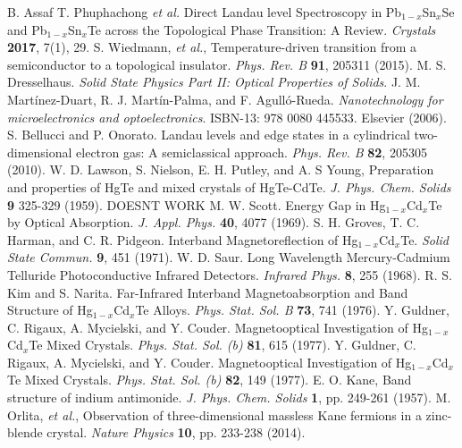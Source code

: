 \documentclass[titlepage,a4paper]{book}
\begin{document}
\begin{thebibliography}{199}
B. Assaf
T. Phuphachong  \textit{et al.} Direct Landau level Spectroscopy in Pb$_{1-x}$Sn$_x$Se and Pb$_{1-x}$Sn$_x$Te across the Topological Phase Transition: A Review. \textit{Crystals} \textbf{2017}, 7(1), 29.
S. Wiedmann, \textit{et al.}, Temperature-driven transition from a semiconductor to a topological insulator. \textit{Phys. Rev. B} \textbf{91}, 205311 (2015).
M. S. Dresselhaus. \textit{Solid State Physics Part II: Optical Properties of Solids}.
J. M. Martínez-Duart, R. J. Martín-Palma, and F. Agulló-Rueda. \textit{Nanotechnology for microelectronics and optoelectronics}. ISBN-13: 978 0080 445533. Elsevier (2006).
S. Bellucci and P. Onorato. Landau levels and edge states in a cylindrical two-dimensional electron gas: A semiclassical approach. \textit{Phys. Rev. B} \textbf{82}, 205305 (2010).
W. D. Lawson, S. Nielson, E. H. Putley, and A. S Young, Preparation and properties of HgTe and mixed crystals of HgTe-CdTe. \textit{J. Phys. Chem. Solids} \textbf{9} 325-329 (1959).
DOESNT WORK
M. W. Scott. Energy Gap in Hg$_{1-x}$Cd$_x$Te by Optical Absorption. \textit{J. Appl. Phys.} \textbf{40}, 4077 (1969).
S. H. Groves, T. C. Harman, and C. R. Pidgeon. Interband Magnetoreflection of Hg$_{1-x}$Cd$_x$Te. \textit{Solid State Commun.} \textbf{9}, 451 (1971).
W. D. Saur. Long Wavelength Mercury-Cadmium Telluride Photoconductive Infrared Detectors. \textit{Infrared Phys.} \textbf{8}, 255 (1968).
R. S. Kim and S. Narita. Far-Infrared Interband Magnetoabsorption and Band Structure of Hg$_{1-x}$Cd$_x$Te Alloys. \textit{Phys. Stat. Sol. B} \textbf{73}, 741 (1976).
Y. Guldner, C. Rigaux, A. Mycielski, and Y. Couder. Magnetooptical Investigation of Hg$_{1-x}$Cd$_x$Te Mixed Crystals. \textit{Phys. Stat. Sol. (b)} \textbf{81}, 615 (1977).
Y. Guldner, C. Rigaux, A. Mycielski, and Y. Couder. Magnetooptical Investigation of Hg$_{1-x}$Cd$_x$Te Mixed Crystals. \textit{Phys. Stat. Sol. (b)} \textbf{82}, 149 (1977).
E. O. Kane, Band structure of indium antimonide. \textit{J. Phys. Chem. Solids} \textbf{1}, pp. 249-261 (1957).
M. Orlita, \textit{et al.}, Observation of three-dimensional massless Kane fermions in a zinc-blende crystal. \textit{Nature Physics} \textbf{10}, pp. 233-238 (2014).

\end{thebibliography}
\end{document}
